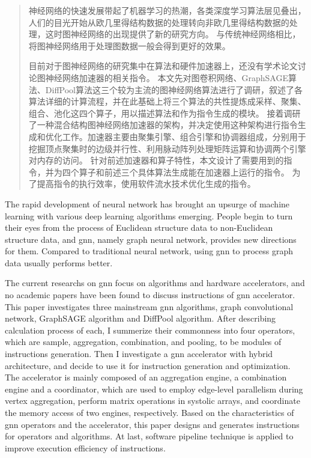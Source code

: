 

\begin{abstract}

  神经网络的快速发展带起了机器学习的热潮，各类深度学习算法层见叠出，人们的目光开始从欧几里得结构数据的处理转向非欧几里得结构数据的处理，这时图神经网络的出现提供了新的研究方向。
  与传统神经网络相比，将图神经网络用于处理图数据一般会得到更好的效果。

  目前对于图神经网络的研究集中在算法和硬件加速器上，还没有学术论文讨论图神经网络加速器的相关指令。
  本文先对图卷积网络、GraphSAGE算法、DiffPool算法这三个较为主流的图神经网络算法进行了调研，叙述了各算法详细的计算流程，并在此基础上将三个算法的共性提炼成采样、聚集、组合、池化这四个算子，用以描述算法和作为指令生成的模块。
  接着调研了一种混合结构图神经网络加速器的架构，并决定使用这种架构进行指令生成和优化工作。加速器主要由聚集引擎、组合引擎和协调器组成，分别用于挖掘顶点聚集时的边级并行性、利用脉动阵列处理矩阵运算和协调两个引擎对内存的访问。
  针对前述加速器和算子特性，本文设计了需要用到的指令，并为四个算子和前述三个具体算法生成能在加速器上运行的指令。
  为了提高指令的执行效率，使用软件流水技术优化生成的指令。

\end{abstract}

\begin{enabstract}

  The rapid development of neural network has brought an upsurge of machine learning with various deep learning algorithms emerging.
  People begin to turn their eyes from the process of Euclidean structure data to non-Euclidean structure data, and gnn, namely graph neural network, provides new directions for them.
  Compared to traditional neural network, using gnn to process graph data usually performs better.

  The current researchs on gnn focus on algorithms and hardware accelerators, and no academic papers have been found to discuss instructions of gnn accelerator.
  This paper investigates three mainstream gnn algorithms, graph convolutional network, GraphSAGE algorithm and DiffPool algorithm.
  After describing calculation process of each, I summerize their commonness into four operators, which are sample, aggregation, combination, and pooling, to be modules of instructions generation.
  Then I investigate a gnn accelerator with hybrid architecture, and decide to use it for instruction generation and optimization.
  The accelerator is mainly composed of an aggregation engine, a combination engine and a coordinator, which are used to employ edge-level parallelism during vertex aggregation, perform matrix operations in systolic arrays, and coordinate the memory access of two engines, respectively.
  Based on the characteristics of gnn operators and the accelerator, this paper designs and generates instructions for operators and algorithms.
  At last, software pipeline technique is applied to improve execution efficiency of instructions.

\end{enabstract}

